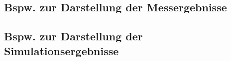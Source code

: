 %
\subsection{Bspw. zur Darstellung der Messergebnisse}
%
\lipsum[1-2]
%
%
%
%
\begin{flushright}
  \textit{\autorA}
\end{flushright}
%
%
%
\subsection{Bspw. zur Darstellung der Simulationsergebnisse}
%
\lipsum[3]
%
%
%
%
\begin{flushright}
  \textit{\autorA}
\end{flushright}
%
%
%